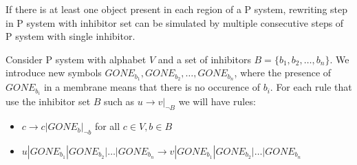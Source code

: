 \begin{lemma}
\label{lemma:inhibitor_step}
  If there is at least one object present in each region of a P system, rewriting step in P system with inhibitor set can be simulated by multiple consecutive steps of P system with single inhibitor.
\end{lemma}

\begin{dokaz}
  Consider P system with alphabet $V$ and a set of inhibitors $B=\{b_1, b_2, \dots ,b_n\}$.
  We introduce new symbols $GONE_{b_1}, GONE_{b_2}, \dots , GONE_{b_n}$, where the presence of $GONE_{b_i}$ in a membrane means that there is no occurence of $b_i$.
  For each rule that use the inhibitor set $B$ such as $u\rightarrow v|_{\neg B}$ we will have rules:
  \begin{itemize}
    \item $c \rightarrow c|GONE_{b}|_{\neg b}$ for all $ c\in V, b\in B$
    \item $u|GONE_{b_1}|GONE_{b_2}|\dots|GONE_{b_n} \rightarrow v|GONE_{b_1}|GONE_{b_2}|\dots|GONE_{b_n}$
  \end{itemize}
\end{dokaz}
